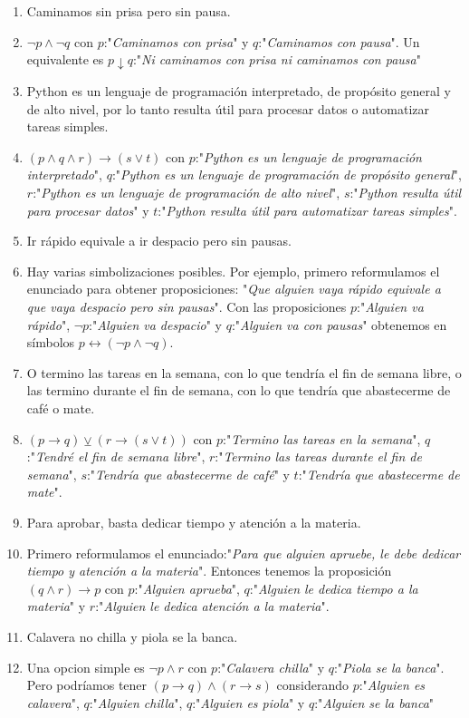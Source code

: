 \documentclass[a4paper]{article}
\newcommand{\answer}{\item[**]}
\newcommand{\then}{\to}
\newcommand{\eq}{\leftrightarrow}
\newcommand{\xor}{\veebar}
\begin{document}
\begin{enumerate}[resume]
\begin{multicols}{2}
\begin{enumerate} [label=(\alph*)]
		\item Caminamos sin prisa pero sin pausa. 
		\answer $\neg p  \land  \neg q$ con $p$:"\textit{Caminamos con prisa}" y $q$:"\textit{Caminamos con pausa}". Un equivalente es $p \downarrow  q$:"\textit{Ni caminamos con prisa ni caminamos con pausa}"

		\item Python es un lenguaje de programación interpretado, de propósito general y de alto nivel, por lo tanto resulta útil para procesar datos o automatizar tareas simples. 
		\answer $( p  \land  q  \land  r ) \then  ( s \lor  t )$ con $p$:"\textit{Python es un lenguaje de programación interpretado}", $q$:"\textit{Python es un lenguaje de programación  de propósito general}", $r$:"\textit{Python es un lenguaje de programación de alto nivel}", $s$:"\textit{Python resulta útil para procesar datos}" y $t$:"\textit{Python resulta útil para automatizar tareas simples}".

		\item Ir rápido equivale a ir despacio pero sin pausas. 
		\answer Hay varias simbolizaciones posibles. Por ejemplo, primero reformulamos el enunciado para obtener proposiciones: "\textit{Que alguien vaya rápido equivale a que vaya despacio pero sin pausas}". Con las proposiciones $p$:"\textit{Alguien va rápido}", $\neg p$:"\textit{Alguien va despacio}" y $q$:"\textit{Alguien va con pausas}" obtenemos en símbolos $p \eq (\neg p \land \neg q)$.

		\item O termino las tareas en la semana, con lo que tendría el fin de semana libre, o las termino durante el fin de semana, con lo que tendría que abastecerme de café o mate.  
		\answer $( p \then  q ) \xor  ( r \then  ( s \lor  t) )$ con $p$:"\textit{Termino las tareas en la semana}", $q$:"\textit{Tendré el fin de semana libre}", $r$:"\textit{Termino las tareas durante el fin de semana}", $s$:"\textit{Tendría que abastecerme de café}" y $t$:"\textit{Tendría que abastecerme de mate}".

		\item Para aprobar, basta dedicar tiempo y atención a la materia.  
		\answer Primero reformulamos el enunciado:"\textit{Para que alguien apruebe, le debe dedicar tiempo y atención a la materia}". Entonces tenemos la proposición $( q  \land  r ) \then  p$ con $p$:"\textit{Alguien aprueba}", $q$:"\textit{Alguien le dedica tiempo a la materia}" y $r$:"\textit{Alguien le dedica atención a la materia}".

		\item Calavera no chilla y piola se la banca.
		\answer Una opcion simple es $\neg p  \land  r$ con $p$:"\textit{Calavera chilla}" y $q$:"\textit{Piola se la banca}". Pero podríamos tener $( p\then q )  \land  ( r\then s )$ considerando $p$:"\textit{Alguien es calavera}", $q$:"\textit{Alguien chilla}", $q$:"\textit{Alguien es piola}" y $q$:"\textit{Alguien se la banca}"


\end{enumerate}
\end{multicols}
\end{enumerate}
\end{document}
